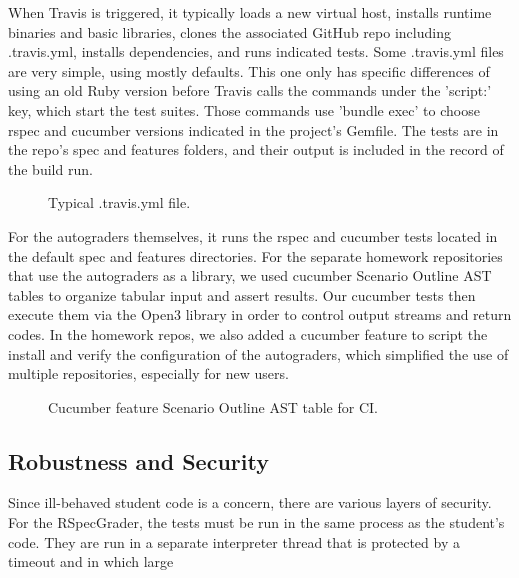 When Travis is triggered, it typically loads a new virtual host, installs runtime binaries and basic libraries, clones the associated GitHub repo including .travis.yml, installs dependencies, and runs indicated tests.
Some .travis.yml files are very simple, using mostly defaults. This one only has specific differences of using an old Ruby version before Travis calls the commands under the 'script:' key, which start the test suites. Those commands use 'bundle exec' to choose rspec and cucumber versions indicated in the project's Gemfile. The tests are in the repo's spec and features folders, and their output is included in the record of the build run.

\begin{figure}[!htbp]
  \centering
  \begin{minipage}{0.70\textwidth}%
  \lstset{tabsize=1,basicstyle=\scriptsize\ttfamily}%
  \end{minipage}
  \caption{\label{fig:rag-ci}%
  Typical .travis.yml file.
}
\end{figure}

For the autograders themselves, it runs the rspec and cucumber tests located in the default spec and features directories. For the separate homework repositories that use the autograders as a library, we used cucumber Scenario Outline AST tables to organize tabular input and assert results. Our cucumber tests then execute them via the Open3 library in order to control output streams and return codes. In the homework repos, we also added a cucumber feature to script the install and verify the configuration of the autograders, which simplified the use of multiple repositories, especially for new users.

\begin{figure}[!htbp]
  \centering
  \begin{minipage}{0.99\textwidth}%
  \lstset{tabsize=1,basicstyle=\scriptsize\ttfamily}%
  \end{minipage}
  \caption{\label{fig:rag-ci}%
  Cucumber feature Scenario Outline AST table for CI.
}
\end{figure}


\subsection{Robustness and Security}

Since ill-behaved student code is a concern, there are various layers of
security.  For the RSpecGrader, the tests must be run in the same
process as the student's code.  They are run in a separate interpreter
thread that is protected by a timeout and in which large 

